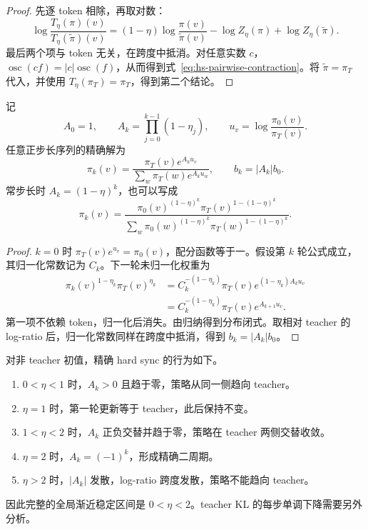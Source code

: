 \begin{proof}
先逐 token 相除，再取对数：
\[
 \log\frac{T_\eta(\pi)(v)}{T_\eta(\widetilde\pi)(v)}
 =(1-\eta)\log\frac{\pi(v)}{\widetilde\pi(v)}
 -\log Z_\eta(\pi)+\log Z_\eta(\widetilde\pi).
\]
最后两个项与 token 无关，在跨度中抵消。对任意实数 $c$，$\operatorname{osc}(cf)=|c|\operatorname{osc}(f)$，从而得到式~\eqref{eq:hs-pairwise-contraction}。将 $\widetilde\pi=\pi_T$ 代入，并使用 $T_\eta(\pi_T)=\pi_T$，得到第二个结论。
\end{proof}

\begin{theorem}[常步长与变步长的精确解]
\label{thm:hard-sync}
记
\[
 A_0=1,\qquad A_k=\prod_{j=0}^{k-1}(1-\eta_j),
 \qquad u_v=\log\frac{\pi_0(v)}{\pi_T(v)}.
\]
任意正步长序列的精确解为
\begin{equation}\label{eq:hard-closed}
 \pi_k(v)=\frac{\pi_T(v)e^{A_k u_v}}
 {\sum_w\pi_T(w)e^{A_k u_w}},
 \qquad b_k=|A_k|b_0.
\end{equation}
常步长时 $A_k=(1-\eta)^k$，也可以写成
\[
 \pi_k(v)=\frac{\pi_0(v)^{(1-\eta)^k}
 \pi_T(v)^{1-(1-\eta)^k}}
 {\sum_w\pi_0(w)^{(1-\eta)^k}
 \pi_T(w)^{1-(1-\eta)^k}}.
\]
\end{theorem}

\begin{proof}
$k=0$ 时 $\pi_T(v)e^{u_v}=\pi_0(v)$，配分函数等于一。假设第 $k$ 轮公式成立，其归一化常数记为 $C_k$。下一轮未归一化权重为
\begin{align*}
 \pi_k(v)^{1-\eta_k}\pi_T(v)^{\eta_k}
 &=C_k^{-(1-\eta_k)}\pi_T(v)
       e^{(1-\eta_k)A_k u_v}\\
 &=C_k^{-(1-\eta_k)}\pi_T(v)e^{A_{k+1}u_v}.
\end{align*}
第一项不依赖 token，归一化后消失。由归纳得到分布闭式。取相对 teacher 的 log-ratio 后，归一化常数同样在跨度中抵消，得到 $b_k=|A_k|b_0$。
\end{proof}

\begin{corollary}[常步长的完整稳定分类]
对非 teacher 初值，精确 hard sync 的行为如下。
\begin{enumerate}
 \item $0<\eta<1$ 时，$A_k>0$ 且趋于零，策略从同一侧趋向 teacher。
 \item $\eta=1$ 时，第一轮更新等于 teacher，此后保持不变。
 \item $1<\eta<2$ 时，$A_k$ 正负交替并趋于零，策略在 teacher 两侧交替收敛。
 \item $\eta=2$ 时，$A_k=(-1)^k$，形成精确二周期。
 \item $\eta>2$ 时，$|A_k|$ 发散，log-ratio 跨度发散，策略不能趋向 teacher。
\end{enumerate}
因此完整的全局渐近稳定区间是 $0<\eta<2$。teacher KL 的每步单调下降需要另外分析。
\end{corollary}

